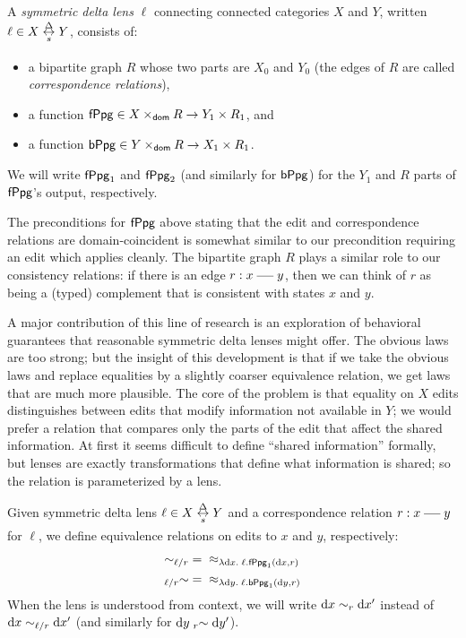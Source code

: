 \begin{definition}
    A \emph{symmetric delta lens} $\ell$ connecting connected categories $X$
    and $Y$, written $\ell \in X \sdlens Y$, consists of:
    \begin{itemize}
        \item a bipartite graph $R$ whose two parts are $X_0$ and $Y_0$ (the
            edges of $R$ are called \emph{correspondence relations}),
        \item a function $\mathsf{fPpg} \in X \times_{\mathsf{dom}} R \to Y_1 \times R_1$,
            and
        \item a function $\mathsf{bPpg} \in Y \times_{\mathsf{dom}} R \to X_1 \times R_1$.
    \end{itemize}
    We will write $\mathsf{fPpg}_1$ and $\mathsf{fPpg}_2$ (and similarly for $\mathsf{bPpg}$)
    for the $Y_1$ and $R$ parts of $\mathsf{fPpg}$'s output, respectively.
\end{definition}

The preconditions for $\mathsf{fPpg}$ above stating that the edit and
correspondence relations are domain-coincident is somewhat similar to our
precondition requiring an edit which applies cleanly. The bipartite graph
$R$ plays a similar role to our consistency relations: if there is an edge
$r : x \uedge y$, then we can think of $r$ as being a (typed) complement
that is consistent with states $x$ and $y$.

A major contribution of this line of research is an exploration of
behavioral guarantees that reasonable symmetric delta lenses might offer.
The obvious laws are too strong; but the insight of this development is that
if we take the obvious laws and replace equalities by a slightly coarser
equivalence relation, we get laws that are much more plausible. The core of
the problem is that equality on $X$ edits distinguishes between edits that
modify information not available in $Y$; we would prefer a relation that
compares only the parts of the edit that affect the shared information.
At first it seems difficult to define ``shared information'' formally, but
lenses are exactly transformations that define what information is shared;
so the relation is parameterized by a lens.

\begin{definition}
    Given symmetric delta lens $\ell \in X \sdlens Y$ and a correspondence
    relation $r : x \uedge y$ for $\ell$, we define equivalence relations on
    edits to $x$ and $y$, respectively:
    \begin{align*}
        \eqsharedl*\ell r &={} \under_{\lambda \dx.\;\ell.\mlfppg_1(\dx,r)} \\
        \eqsharedr*\ell r &={} \under_{\lambda \dy.\;\ell.\mlbppg_1(\dy,r)}
    \end{align*}
    When the lens is understood from context, we will write $\dx\eqsharedl
    r\dx'$ instead of $\dx\eqsharedl*\ell r\dx'$ (and similarly for
    $\dy\eqsharedr r\dy'$).
\end{definition}

